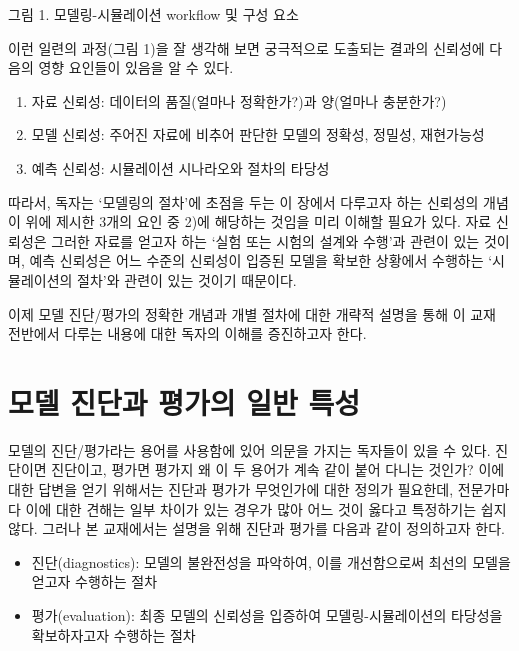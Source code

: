 \documentclass[
  10pt,
]{krantz}
\begin{document}
그림 1. 모델링-시뮬레이션 workflow 및 구성 요소

이런 일련의 과정(그림 1)을 잘 생각해 보면 궁극적으로 도출되는 결과의 신뢰성에 다음의 영향 요인들이 있음을 알 수 있다.

\begin{enumerate}
\def\labelenumi{\arabic{enumi})}
\item
  자료 신뢰성: 데이터의 품질(얼마나 정확한가?)과 양(얼마나 충분한가?)
\item
  모델 신뢰성: 주어진 자료에 비추어 판단한 모델의 정확성, 정밀성, 재현가능성
\item
  예측 신뢰성: 시뮬레이션 시나라오와 절차의 타당성
\end{enumerate}

따라서, 독자는 `모델링의 절차'에 초점을 두는 이 장에서 다루고자 하는 신뢰성의 개념이 위에 제시한 3개의 요인 중 2)에
해당하는 것임을 미리 이해할 필요가 있다. 자료 신뢰성은 그러한 자료를 얻고자 하는 `실험 또는 시험의 설계와 수행'과
관련이 있는 것이며, 예측 신뢰성은 어느 수준의 신뢰성이 입증된 모델을 확보한 상황에서 수행하는 `시뮬레이션의 절차'와 관련이
있는 것이기 때문이다.

이제 모델 진단/평가의 정확한 개념과 개별 절차에 대한 개략적 설명을 통해 이 교재 전반에서 다루는 내용에 대한 독자의 이해를
증진하고자 한다.

\hypertarget{uxbaa8uxb378-uxc9c4uxb2e8uxacfc-uxd3c9uxac00uxc758-uxc77cuxbc18-uxd2b9uxc131}{%
\section{모델 진단과 평가의 일반 특성}\label{uxbaa8uxb378-uxc9c4uxb2e8uxacfc-uxd3c9uxac00uxc758-uxc77cuxbc18-uxd2b9uxc131}}

모델의 진단/평가라는 용어를 사용함에 있어 의문을 가지는 독자들이 있을 수 있다. 진단이면 진단이고, 평가면 평가지 왜 이 두
용어가 계속 같이 붙어 다니는 것인가? 이에 대한 답변을 얻기 위해서는 진단과 평가가 무엇인가에 대한 정의가 필요한데,
전문가마다 이에 대한 견해는 일부 차이가 있는 경우가 많아 어느 것이 옳다고 특정하기는 쉽지 않다. 그러나 본 교재에서는
설명을 위해 진단과 평가를 다음과 같이 정의하고자 한다.

\begin{itemize}
\item
  진단(diagnostics): 모델의 불완전성을 파악하여, 이를 개선함으로써 최선의 모델을 얻고자 수행하는 절차
\item
  평가(evaluation): 최종 모델의 신뢰성을 입증하여 모델링-시뮬레이션의 타당성을 확보하자고자 수행하는 절차
\end{itemize}
\end{document}
